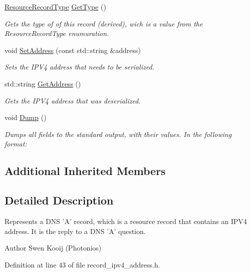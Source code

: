 \begin{DoxyCompactItemize}
\hyperlink{namespace_senergy_1_1_dns_a590bfd748c955364770f5ce358d9dfe0}{Resource\-Record\-Type} \hyperlink{class_senergy_1_1_dns_1_1_i_p_v4_record_a7f67f0546dc2d93b04a264fabf871d78}{Get\-Type} ()
\begin{DoxyCompactList}\small\item\em Gets the type of of this record (derived), wich is a value from the Resource\-Record\-Type enumuration. \end{DoxyCompactList}\item 
void \hyperlink{class_senergy_1_1_dns_1_1_i_p_v4_record_a9bbb0fc972caec65cca5df46357c35e6}{Set\-Address} (const std\-::string \&address)
\begin{DoxyCompactList}\small\item\em Sets the I\-P\-V4 address that needs to be serialized. \end{DoxyCompactList}\item 
std\-::string \hyperlink{class_senergy_1_1_dns_1_1_i_p_v4_record_ab1417b773cb8281a8766ad092b559a1e}{Get\-Address} ()
\begin{DoxyCompactList}\small\item\em Gets the I\-P\-V4 address that was deserialized. \end{DoxyCompactList}\item 
void \hyperlink{class_senergy_1_1_dns_1_1_i_p_v4_record_a5dc31b6ac003bf5b8897d1431e9eb0db}{Dump} ()
\begin{DoxyCompactList}\small\item\em Dumps all fields to the standard output, with their values. In the following format\-: \end{DoxyCompactList}\end{DoxyCompactItemize}
\subsection*{Additional Inherited Members}


\subsection{Detailed Description}
Represents a D\-N\-S 'A' record, which is a resource record that contains an I\-P\-V4 address. It is the reply to a D\-N\-S 'A' question. 

\begin{DoxyAuthor}{Author}
Swen Kooij (Photonios) 
\end{DoxyAuthor}


Definition at line 43 of file record\-\_\-ipv4\-\_\-address.\-h.



